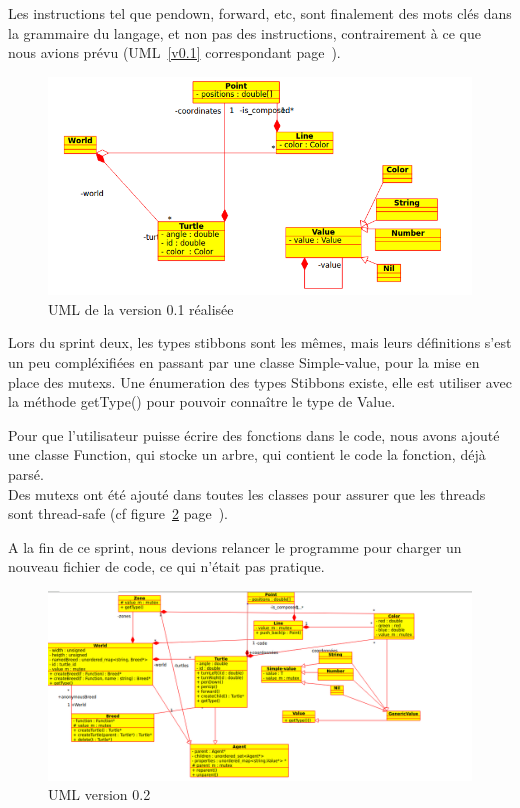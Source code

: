 Les instructions tel que pendown, forward, etc, sont finalement des mots clés dans la grammaire du langage, et non pas des instructions, contrairement à ce que nous avions prévu (UML~\ref{v0.1} correspondant page~\pageref{v0.1}).\\


\begin{figure}[h]
\caption{\label{v0.1R} UML de la version 0.1 réalisée}
\includegraphics[scale=0.5]{doc/report/uml/v01reel.png}
\end{figure}

Lors du sprint deux, les types stibbons sont les mêmes, mais leurs définitions s'est un peu compléxifiées en passant par une classe Simple-value, pour la mise en place des mutexs. Une énumeration des types Stibbons existe, elle est utiliser avec la méthode getType() pour pouvoir connaître le type de Value.


Pour que l'utilisateur puisse écrire des fonctions dans le code, nous avons ajouté une classe Function, qui stocke un arbre, qui contient le code la fonction, déjà parsé.
\\ Des mutexs ont été ajouté dans toutes les classes pour assurer que les threads sont thread-safe (cf figure~\ref{v0.2} page~\pageref{v0.2}).


A la fin de ce sprint, nous devions relancer le programme pour charger un nouveau fichier de code, ce qui n'était pas pratique.



\begin{figure}[h]
\caption{\label{v0.2} UML version 0.2}
\includegraphics[scale=0.45]{doc/report/uml/v02.png}
\end{figure}

